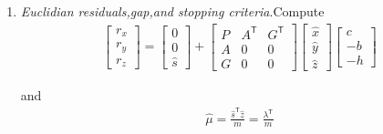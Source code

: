 \begin{enumerate}
    \item\textit{Euclidian residuals,gap,and stopping criteria}.Compute\\
    \begin{equation}
    	\begin{aligned}
    		\begin{bmatrix}
        		r_x\\
        		r_y\\
        		r_z
    		\end{bmatrix}
    		=
    		\begin{bmatrix}
        		0\\
        		0\\
        		\hat s
    		\end{bmatrix}
    		+
    		\begin{bmatrix}
        		P & A^\mathsf{T} & G^\mathsf{T}\\
        		A & 0 & 0\\
        		G & 0 & 0
    		\end{bmatrix}
    		\begin{bmatrix}
        		\hat x\\
        		\hat y\\
        		\hat z
    		\end{bmatrix}
    		\begin{bmatrix}
        		c\\
        		-b\\
        		-h
    		\end{bmatrix}
    	\end{aligned}
    	\label{eqn:cvxopt_algorithm_1}
    \end{equation}

    and\\
    \begin{equation*}
    	\begin{aligned}
    		\hat{\mu} = \frac{\hat{s}^\mathsf{T}\hat{z}}{m}=\frac{\lambda^\mathsf{T}}{m}
    	\end{aligned}
    \end{equation*}


\end{enumerate}
